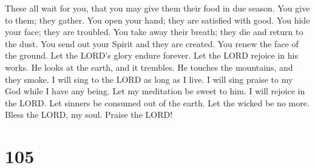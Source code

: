  These all wait for you, that you may give them their
food in due season.  You give to them; they gather. You
open your hand; they are satisfied with good.  You hide
your face; they are troubled. You take away their breath; they die and
return to the dust.  You send out your Spirit and they
are created. You renew the face of the ground.  Let the
LORD's glory endure forever. Let the LORD rejoice in his works.
 He looks at the earth, and it trembles. He touches the
mountains, and they smoke.  I will sing to the LORD as
long as I live. I will sing praise to my God while I have any being.
 Let my meditation be sweet to him. I will rejoice in the
LORD.  Let sinners be consumed out of the earth. Let the
wicked be no more. Bless the LORD, my soul. Praise the LORD!

\hypertarget{section-97}{%
\section{105}\label{section-97}}

